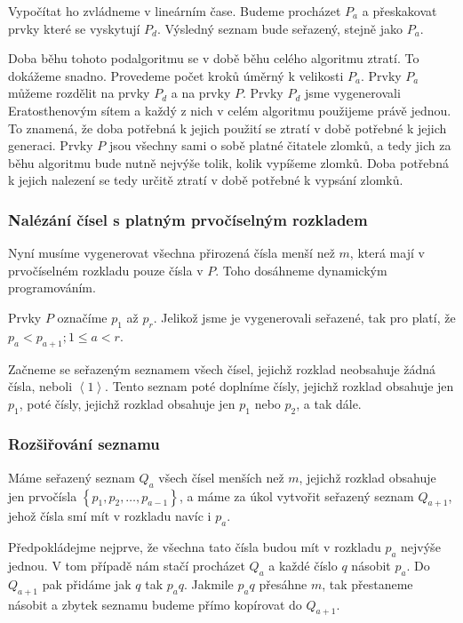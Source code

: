 \documentclass{article}
\begin{document}
Vypočítat ho zvládneme v lineárním čase. Budeme procházet $P_a$ a přeskakovat prvky které se vyskytují $P_d$. Výsledný seznam bude seřazený, stejně jako $P_a$.

Doba běhu tohoto podalgoritmu se v době běhu celého algoritmu ztratí. To dokážeme snadno. Provedeme počet kroků úměrný k velikosti $P_a$. Prvky $P_a$ můžeme rozdělit na prvky $P_d$ a na prvky $P$. Prvky $P_d$ jsme vygenerovali Eratosthenovým sítem a každý z nich v celém algoritmu použijeme právě jednou. To znamená, že doba potřebná k jejich použití se ztratí v době potřebné k jejich generaci. Prvky $P$ jsou všechny sami o sobě platné čitatele zlomků, a tedy jich za běhu algoritmu bude nutně nejvýše tolik, kolik vypíšeme zlomků. Doba potřebná k jejich nalezení se tedy určitě ztratí v době potřebné k vypsání zlomků.

\subsubsection{Nalézání čísel s platným prvočíselným rozkladem}

Nyní musíme vygenerovat všechna přirozená čísla menší než $m$, která mají v prvočíselném rozkladu pouze čísla v $P$. Toho dosáhneme dynamickým programováním.

Prvky $P$ označíme $p_1$ až $p_r$. Jelikož jsme je vygenerovali seřazené, tak pro platí, že $p_a < p_{a+1}; 1 \leq a < r$.

Začneme se seřazeným seznamem všech čísel, jejichž rozklad neobsahuje žádná čísla, neboli $\left<1\right>$. Tento seznam poté doplníme čísly, jejichž rozklad obsahuje jen $p_1$, poté čísly, jejichž rozklad obsahuje jen $p_1$ nebo $p_2$, a tak dále.

\subsubsection{Rozšiřování seznamu}

Máme seřazený seznam $Q_a$ všech čísel menších než $m$, jejichž rozklad obsahuje jen prvočísla $\left\{p_1, p_2, \dots, p_{a-1}\right\}$, a máme za úkol vytvořit seřazený seznam $Q_{a+1}$, jehož čísla smí mít v rozkladu navíc i $p_a$.

Předpokládejme nejprve, že všechna tato čísla budou mít v rozkladu $p_a$ nejvýše jednou. V tom případě nám stačí procházet $Q_a$ a každé číslo $q$ násobit $p_a$. Do $Q_{a+1}$ pak přidáme jak $q$ tak $p_a q$. Jakmile $p_a q$ přesáhne $m$, tak přestaneme násobit a zbytek seznamu budeme přímo kopírovat do $Q_{a+1}$.
\end{document}
